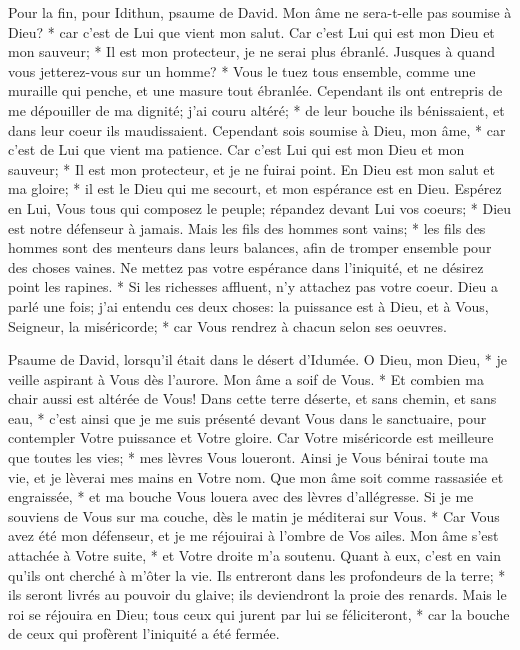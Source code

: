 Pour la fin, pour Idithun, psaume de David.
Mon âme ne sera-t-elle pas soumise à Dieu? * car c'est de Lui que vient mon salut.
Car c'est Lui qui est mon Dieu et mon sauveur; * Il est mon protecteur, je ne serai plus ébranlé.
Jusques à quand vous jetterez-vous sur un homme? * Vous le tuez tous ensemble, comme une muraille qui penche, et une masure tout ébranlée.
Cependant ils ont entrepris de me dépouiller de ma dignité; j'ai couru altéré; * de leur bouche ils bénissaient, et dans leur coeur ils maudissaient.
Cependant sois soumise à Dieu, mon âme, * car c'est de Lui que vient ma patience.
Car c'est Lui qui est mon Dieu et mon sauveur; * Il est mon protecteur, et je ne fuirai point.
En Dieu est mon salut et ma gloire; * il est le Dieu qui me secourt, et mon espérance est en Dieu.
Espérez en Lui, Vous tous qui composez le peuple; répandez devant Lui vos coeurs; * Dieu est notre défenseur à jamais.
Mais les fils des hommes sont vains; * les fils des hommes sont des menteurs dans leurs balances, afin de tromper ensemble pour des choses vaines.
Ne mettez pas votre espérance dans l'iniquité, et ne désirez point les rapines. * Si les richesses affluent, n'y attachez pas votre coeur.
Dieu a parlé une fois; j'ai entendu ces deux choses: la puissance est à Dieu,
et à Vous, Seigneur, la miséricorde; * car Vous rendrez à chacun selon ses oeuvres.

Psaume de David, lorsqu'il était dans le désert d'Idumée.
O Dieu, mon Dieu, * je veille aspirant à Vous dès l'aurore. Mon âme a soif de Vous. * Et combien ma chair aussi est altérée de Vous!
Dans cette terre déserte, et sans chemin, et sans eau, * c'est ainsi que je me suis présenté devant Vous dans le sanctuaire, pour contempler Votre puissance et Votre gloire.
Car Votre miséricorde est meilleure que toutes les vies; * mes lèvres Vous loueront.
Ainsi je Vous bénirai toute ma vie, et je lèverai mes mains en Votre nom.
Que mon âme soit comme rassasiée et engraissée, * et ma bouche Vous louera avec des lèvres d'allégresse.
Si je me souviens de Vous sur ma couche, dès le matin je méditerai sur Vous. *
Car Vous avez été mon défenseur, et je me réjouirai à l'ombre de Vos ailes.
Mon âme s'est attachée à Votre suite, * et Votre droite m'a soutenu.
Quant à eux, c'est en vain qu'ils ont cherché à m'ôter la vie. Ils entreront dans les profondeurs de la terre; *
ils seront livrés au pouvoir du glaive; ils deviendront la proie des renards.
Mais le roi se réjouira en Dieu; tous ceux qui jurent par lui se féliciteront, * car la bouche de ceux qui profèrent l'iniquité a été fermée.


